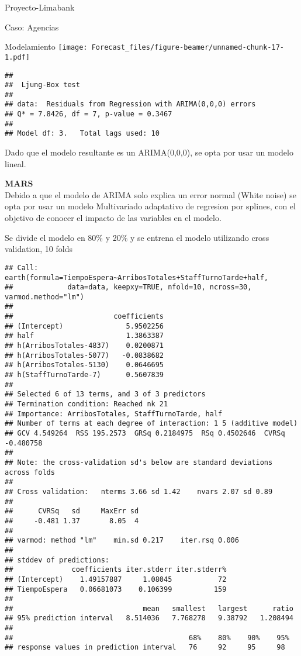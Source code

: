 \documentclass[
  ignorenonframetext,
]{beamer}
\begin{document}
\begin{frame}[fragile]{Proyecto-Limabank}
\begin{block}{Caso: Agencias}
\begin{block}{Modelamiento}
\texttt{[image: Forecast\_files/figure-beamer/unnamed-chunk-17-1.pdf]}

\begin{verbatim}
## 
##  Ljung-Box test
## 
## data:  Residuals from Regression with ARIMA(0,0,0) errors
## Q* = 7.8426, df = 7, p-value = 0.3467
## 
## Model df: 3.   Total lags used: 10
\end{verbatim}

Dado que el modelo resultante es un ARIMA(0,0,0), se opta por usar un
modelo lineal.

\textbf{MARS}\\
Debido a que el modelo de ARIMA solo explica un error normal (White
noise) se opta por usar un modelo Multivariado adaptativo de regresion
por splines, con el objetivo de conocer el impacto de las variables en
el modelo.

Se divide el modelo en 80\% y 20\% y se entrena el modelo utilizando
cross validation, 10 folds

\begin{verbatim}
## Call: earth(formula=TiempoEspera~ArribosTotales+StaffTurnoTarde+half,
##             data=data, keepxy=TRUE, nfold=10, ncross=30, varmod.method="lm")
## 
##                        coefficients
## (Intercept)               5.9502256
## half                      1.3863387
## h(ArribosTotales-4837)    0.0200871
## h(ArribosTotales-5077)   -0.0838682
## h(ArribosTotales-5130)    0.0646695
## h(StaffTurnoTarde-7)      0.5607839
## 
## Selected 6 of 13 terms, and 3 of 3 predictors
## Termination condition: Reached nk 21
## Importance: ArribosTotales, StaffTurnoTarde, half
## Number of terms at each degree of interaction: 1 5 (additive model)
## GCV 4.549264  RSS 195.2573  GRSq 0.2184975  RSq 0.4502646  CVRSq -0.480758
## 
## Note: the cross-validation sd's below are standard deviations across folds
## 
## Cross validation:   nterms 3.66 sd 1.42    nvars 2.07 sd 0.89
## 
##      CVRSq   sd     MaxErr sd
##     -0.481 1.37       8.05  4
## 
## varmod: method "lm"    min.sd 0.217    iter.rsq 0.006
## 
## stddev of predictions:
##              coefficients iter.stderr iter.stderr%
## (Intercept)    1.49157887     1.08045           72
## TiempoEspera   0.06681073    0.106399          159
## 
##                               mean   smallest   largest      ratio
## 95% prediction interval   8.514036   7.768278   9.38792   1.208494
## 
##                                          68%    80%    90%    95% 
## response values in prediction interval   76     92     95     98
\end{verbatim}


\end{block}
\end{block}
\end{frame}
\end{document}
